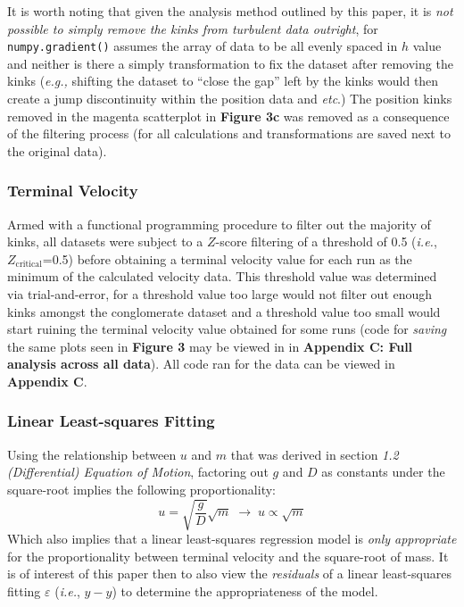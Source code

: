 \documentclass[12pt]{article}
\begin{document}
\begin{multicols}{2}
It is worth noting that given the analysis method outlined by this paper, it is \textit{not possible to simply remove the kinks from turbulent data outright},
for \texttt{numpy.gradient()} assumes the array of data to be all evenly spaced in $h$ value and neither is there a simply transformation to fix the dataset after removing the kinks
(\textit{e.g.,} shifting the dataset to ``close the gap'' left by the kinks would then create a jump discontinuity within the position data and \textit{etc}.)
The position kinks removed in the magenta scatterplot in \textbf{Figure 3c} was removed as a consequence of the filtering process (for all calculations and transformations are saved next to the original data).

\subsubsection{Terminal Velocity}
Armed with a functional programming procedure to filter out the majority of kinks,
all datasets were subject to a $Z$-score filtering of a threshold of 0.5 (\textit{i.e.}, $Z_\text{critical}$=0.5) before obtaining a terminal velocity value for each run as the minimum of the calculated velocity data.
This threshold value was determined via trial-and-error, for a threshold value too large would not filter out enough kinks amongst the conglomerate dataset and a threshold value too small would start ruining the terminal velocity value obtained for some runs
(code for \textit{saving} the same plots seen in \textbf{Figure 3} may be viewed in in \textbf{Appendix C: Full analysis across all data}).
All code ran for the data can be viewed in \textbf{Appendix C}.

\subsubsection{Linear Least-squares Fitting}
Using the relationship between $u$ and $m$ that was derived in section \textit{1.2 (Differential) Equation of Motion},
factoring out $g$ and $D$ as constants under the square-root implies the following proportionality:
$$u=\sqrt{\frac{g}{D}}\sqrt{m}\;\longrightarrow\;u\propto\sqrt{m}$$
Which also implies that a linear least-squares regression model is \textit{only appropriate} for the proportionality between terminal velocity and the square-root of mass.
It is of interest of this paper then to also view the \textit{residuals} of a linear least-squares fitting $\varepsilon$ (\textit{i.e.}, $\hat{y}-y$) to determine the appropriateness of the model.


\end{multicols}
\end{document}
